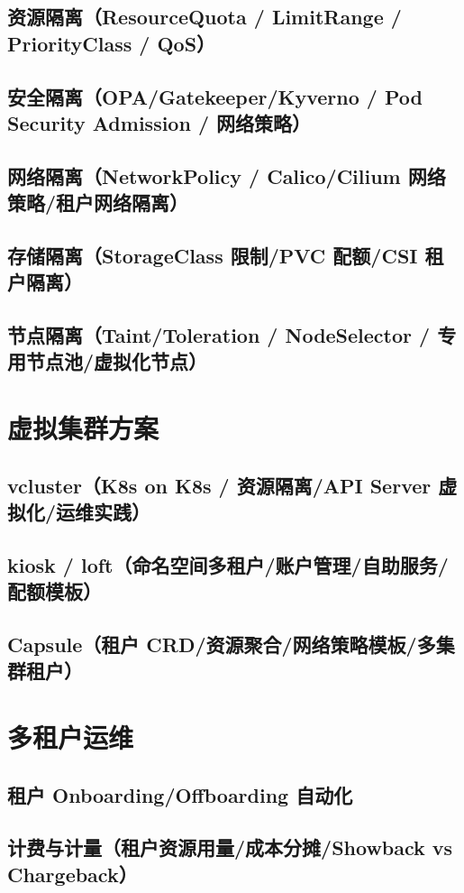 \documentclass[12pt,UTF8]{ctexbook}
\begin{document}
    \subsection{资源隔离（ResourceQuota / LimitRange / PriorityClass / QoS）}
    \subsection{安全隔离（OPA/Gatekeeper/Kyverno / Pod Security Admission / 网络策略）}
    \subsection{网络隔离（NetworkPolicy / Calico/Cilium 网络策略/租户网络隔离）}
    \subsection{存储隔离（StorageClass 限制/PVC 配额/CSI 租户隔离）}
    \subsection{节点隔离（Taint/Toleration / NodeSelector / 专用节点池/虚拟化节点）}

  \section{虚拟集群方案}
    \subsection{vcluster（K8s on K8s / 资源隔离/API Server 虚拟化/运维实践）}
    \subsection{kiosk / loft（命名空间多租户/账户管理/自助服务/配额模板）}
    \subsection{Capsule（租户 CRD/资源聚合/网络策略模板/多集群租户）}

  \section{多租户运维}
    \subsection{租户 Onboarding/Offboarding 自动化}
    \subsection{计费与计量（租户资源用量/成本分摊/Showback vs Chargeback）}
\end{document}
